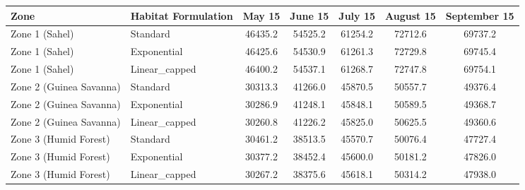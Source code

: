 \begin{tabular}{llccccc}
\hline
Zone & Habitat Formulation & May 15 & June 15 & July 15 & August 15 & September 15 \\
\hline
Zone 1 (Sahel) & Standard & 46435.2 & 54525.2 & 61254.2 & 72712.6 & 69737.2 \\
Zone 1 (Sahel) & Exponential & 46425.6 & 54530.9 & 61261.3 & 72729.8 & 69745.4 \\
Zone 1 (Sahel) & Linear_capped & 46400.2 & 54537.1 & 61268.7 & 72747.8 & 69754.1 \\
Zone 2 (Guinea Savanna) & Standard & 30313.3 & 41266.0 & 45870.5 & 50557.7 & 49376.4 \\
Zone 2 (Guinea Savanna) & Exponential & 30286.9 & 41248.1 & 45848.1 & 50589.5 & 49368.7 \\
Zone 2 (Guinea Savanna) & Linear_capped & 30260.8 & 41226.2 & 45825.0 & 50625.5 & 49360.6 \\
Zone 3 (Humid Forest) & Standard & 30461.2 & 38513.5 & 45570.7 & 50076.4 & 47727.4 \\
Zone 3 (Humid Forest) & Exponential & 30377.2 & 38452.4 & 45600.0 & 50181.2 & 47826.0 \\
Zone 3 (Humid Forest) & Linear_capped & 30267.2 & 38375.6 & 45618.1 & 50314.2 & 47938.0 \\
\hline
\end{tabular}
